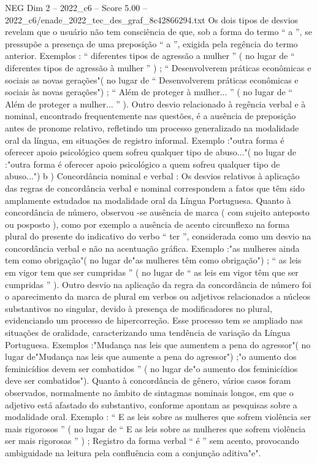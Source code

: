 \begin{textsample}{NEG Dim 2 – 2022\_c6 – Score 5.00 – 2022\_c6/enade\_2022\_tec\_des\_graf\_8c42866294.txt}
Os dois tipos de desvios revelam que o usuário não tem consciência de que, sob a forma do termo “ a ”, se pressupõe a presença de uma preposição “ a ”, exigida pela regência do termo anterior.
Exemplos : “ diferentes tipos de agressão a mulher ” ( no lugar de “ diferentes tipos de agressão à mulher ” ) ; “ Desenvolverem práticas econômicas e sociais as novas gerações"( no lugar de “ Desenvolverem práticas econômicas e sociais às novas gerações") ; “ Além de proteger à mulher... ” ( no lugar de “ Além de proteger a mulher... ” ).
Outro desvio relacionado à regência verbal e à nominal, encontrado frequentemente nas questões, é a ausência de preposição antes de pronome relativo, refletindo um processo generalizado na modalidade oral da língua, em situações de registro informal.
Exemplo :"outra forma é oferecer apoio psicológico quem sofreu qualquer tipo de abuso..."( no lugar de :"outra forma é oferecer apoio psicológico a quem sofreu qualquer tipo de abuso...") b ) Concordância nominal e verbal : Os desvios relativos à aplicação das regras de concordância verbal e nominal correspondem a fatos que têm sido amplamente estudados na modalidade oral da Língua Portuguesa.
Quanto à concordância de número, observou -se ausência de marca ( com sujeito anteposto ou posposto ), como por exemplo a ausência de acento circunflexo na forma plural do presente do indicativo do verbo “ ter ”, considerada como um desvio na concordância verbal e não na acentuação gráfica.
Exemplo :"as mulheres ainda tem como obrigação"( no lugar de"as mulheres têm como obrigação") ; “ as leis em vigor tem que ser cumpridas ” ( no lugar de “ as leis em vigor têm que ser cumpridas ” ).
Outro desvio na aplicação da regra da concordância de número foi o aparecimento da marca de plural em verbos ou adjetivos relacionados a núcleos substantivos no singular, devido à presença de modificadores no plural, evidenciando um processo de hipercorreção.
Esse processo tem se ampliado nas situações de oralidade, caracterizando uma tendência de variação da Língua Portuguesa.
Exemplos :"Mudança nas leis que aumentem a pena do agressor"( no lugar de"Mudança nas leis que aumente a pena do agressor") ;"o aumento dos feminicídios devem ser combatidos ” ( no lugar de"o aumento dos feminicídios deve ser combatidos").
Quanto à concordância de gênero, vários casos foram observados, normalmente no âmbito de sintagmas nominais longos, em que o adjetivo está afastado do substantivo, conforme apontam as pesquisas sobre a modalidade oral.
Exemplo : “ E as leis sobre as mulheres que sofrem violência ser mais rigorosos ” ( no lugar de “ E as leis sobre as mulheres que sofrem violência ser mais rigorosas ” ) ; Registro da forma verbal “ é ” sem acento, provocando ambiguidade na leitura pela confluência com a conjunção aditiva"e".

\end{textsample}
